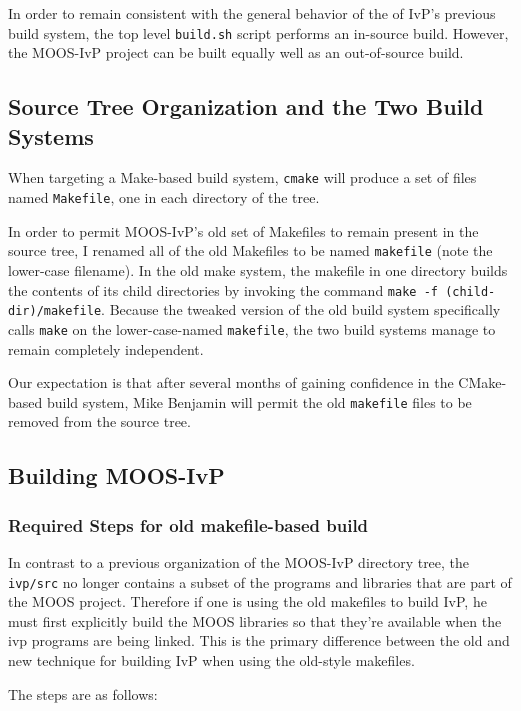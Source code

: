 \documentclass[letterpaper,10pt]{article}
\begin{document}
In order to remain consistent with the general behavior of the of IvP's
previous build system, the top level \verb|build.sh| script performs an
in-source build.  However, the MOOS-IvP project can be built equally well
as an out-of-source build.

\subsection{Source Tree Organization and the Two Build Systems}
When targeting a Make-based build system, \verb|cmake| will produce a set
of files named \verb|Makefile|, one in each directory of the tree.

In order to permit MOOS-IvP's old set of Makefiles to remain present in
the source tree, I renamed all of the old Makefiles to be named \verb|makefile|
(note the lower-case filename).  In the old make system, the makefile
in one directory builds the contents of its child directories by invoking
the command \verb|make -f (child-dir)/makefile|.  Because the tweaked version of the 
old build system specifically calls \verb|make| on the lower-case-named \verb|makefile|,
the two build systems manage to remain completely independent.

Our expectation is that after several months of gaining confidence in the CMake-based
build system, Mike Benjamin will permit the old \verb|makefile| files to be 
removed from the source tree.

\subsection{Building MOOS-IvP}

\subsubsection{Required Steps for old makefile-based build}
In contrast to a previous organization of the MOOS-IvP directory tree, the
\verb|ivp/src| no longer contains a subset of the programs and libraries that are
part of the MOOS project.  Therefore if one is using the old makefiles to build
IvP, he must first explicitly build the MOOS libraries so that they're available when
the ivp programs are being linked.  This is the primary difference between the old
and new technique for building IvP when using the old-style makefiles.

The steps are as follows:
\end{document}
